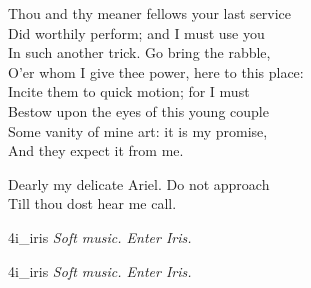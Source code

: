 

\begin{verse_speech}[Prospero] 
Thou and thy meaner fellows your last service\\
Did worthily perform; and I must use you\\
In such another trick. Go bring the rabble,\\
O'er whom I give thee power, here to this place:\\
Incite them to quick motion; for I must\\
Bestow upon the eyes of this young couple\\
Some vanity of mine art: it is my promise,\\
And they expect it from me.
\end{verse_speech}



\begin{verse_speech}[Ariel] 
	\begin{song}
\end{song}
\end{verse_speech}

\begin{verse_speech}[Prospero] 
Dearly my delicate Ariel. Do not approach\\
Till thou dost hear me call.
\end{verse_speech}

\begin{letter}
	\enlargethispage{\baselineskip}
\end{letter}



\begin{pictures} %
	\begin{letter}
		\begin{colorbigpic}
			[1.1]
			{4i_iris}
			{\textit{Soft music. Enter Iris.}}
		\end{colorbigpic}
	\end{letter}
	\begin{a4}
		\begin{colorbigpic}
			[1]
			{4i_iris}
			{\textit{Soft music. Enter Iris.}}
		\end{colorbigpic}
	\end{a4}
\end{pictures}

